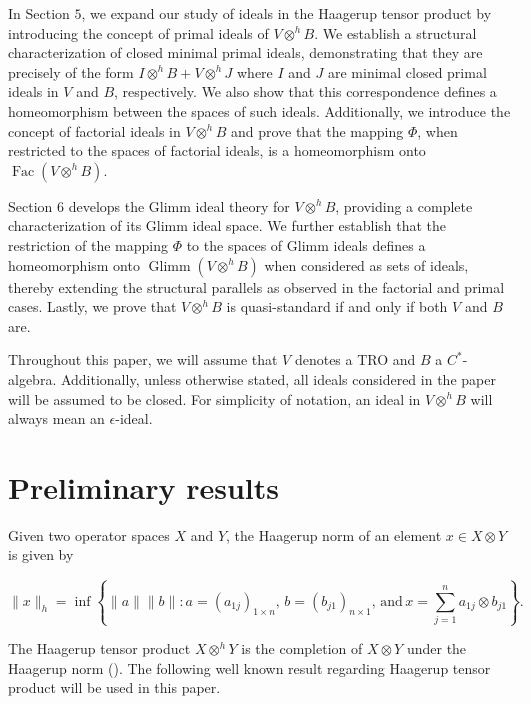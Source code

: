 \documentclass{birkjour}
\theoremstyle{definition}
\theoremstyle{remark}
\numberwithin{equation}{section}
\begin{document}
In Section $5$, we expand our study of ideals in the Haagerup tensor product by introducing the concept of primal ideals of $V \otimes^h B$. We establish a structural characterization of closed minimal primal ideals, demonstrating that they are precisely of the form $I \otimes^h B+V \otimes^h J$  where $I$ and $J$ are minimal closed primal ideals in $V$ and $B$, respectively. We also show that this correspondence defines a homeomorphism between the spaces of such ideals. Additionally, we introduce the concept of factorial ideals in $V \otimes^h B$ and prove that the mapping $\Phi$, when restricted to the spaces of factorial ideals, is a homeomorphism onto $\operatorname{Fac}(V \otimes^h B)$. 

 Section $6$ develops the Glimm ideal theory for \(V \otimes^h B\), providing a complete characterization of its Glimm ideal space. We further establish that  the restriction of the mapping $\Phi$ to the spaces of Glimm ideals defines a homeomorphism onto $\operatorname{Glimm}(V \otimes^h B)$ when considered as sets of ideals, thereby extending the structural parallels as observed in the factorial and primal cases.  Lastly, we prove that $V\otimes^{h} B$ is quasi-standard if and only if both $V$ and $B$ are.


Throughout this paper, we will assume that $V$ denotes a TRO and $B$ a $C^{\ast}$-algebra. Additionally, unless otherwise stated, all ideals considered in the paper will be assumed to be closed. For simplicity of notation, an ideal in $V \otimes^h B$ will always mean an $\epsilon$-ideal. 









 
 

\section{Preliminary results} 

Given two operator spaces $X$ and $Y$, the Haagerup norm of an element $x \in X \otimes Y$  is given  by

\[
\|x\|_h = \inf \left\{ \|a\| \|b\| : a = (a_{1j})_{1 \times n}, \, b = (b_{j1})_{n \times 1}, \, \text{and} \, x = \sum_{j=1}^n a_{1j} \otimes b_{j1} \right\}.
\]

 The Haagerup tensor product $X \otimes^h Y$ is the completion of \( X \otimes Y \) under the Haagerup norm (\cite{ER}). The following well known result regarding Haagerup tensor product will be used in this paper.  
\end{document}
